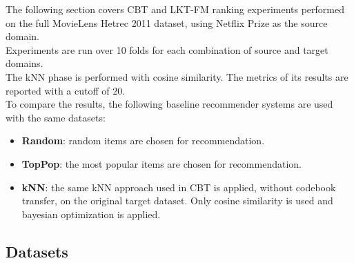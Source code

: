 The following section covers CBT and LKT-FM ranking experiments performed on the full MovieLens Hetrec 2011 dataset, using Netflix Prize as the source domain.\\
Experiments are run over 10 folds for each combination of source and target domains.\\
The kNN phase is performed with cosine similarity. The metrics of its results are reported with a cutoff of 20.\\
To compare the results, the following baseline recommender systems are used with the same datasets:
\begin{itemize}
\item \textbf{Random}: random items are chosen for recommendation.
\item \textbf{TopPop}: the most popular items are chosen for recommendation.
\item \textbf{kNN}: the same kNN approach used in CBT is applied, without codebook transfer, on the original target dataset. Only cosine similarity is used and bayesian optimization is applied.
\end{itemize}


\subsection{Datasets}

